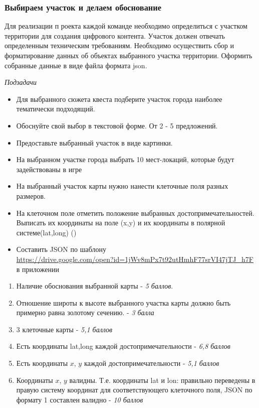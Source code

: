 
\subsubsection*{Выбираем участок и делаем обоснование}

Для реализации п
роекта каждой команде необходимо определиться с участком территории для создания цифрового контента. Участок должен отвечать определенным техническим требованиям. Необходимо осуществить сбор и форматирование данных об объектах выбранного участка территории. Оформить собранные данные в виде файла формата json.

\textit{Подзадачи}
\begin{itemize} 
    \item Для выбранного сюжета квеста подберите участок города наиболее тематически подходящий. 
    \item Обоснуйте свой выбор в текстовой форме. От 2 - 5 предложений.
    \item Предоставьте выбранный участок в виде картинки.
    \item На выбранном участке города выбрать 10 мест-локаций, которые будут задействованы в игре
    \item На выбранный участок карты нужно нанести клеточные поля разных размеров.
    \item На клеточном поле отметить положение выбранных достопримечательностей. Выписать их координаты на поле (x,y) и их координаты в полярной системе(lat,long) ()
    \item Составить JSON по шаблону \\ \url{https://drive.google.com/open?id=1jWv8mPx7t92utHmhF77srVI47jTJ_h7F}  в приложении
\end{itemize}

\markSection

\begin{enumerate}
    \item Наличие обоснования выбранной карты - \textit{5 баллов}.
    \item Отношение широты к высоте выбранного участка карты должно быть примерно равна золотому сечению. - \textit{3 балла}
    \item 3 клеточные карты - \textit{5,1 баллов}
    \item Есть координаты lat,long каждой достопримечательности - \textit{6,8 баллов}
    \item Есть координаты $x$, $y$ каждой достопримечательности - \textit{5,1 баллов}
    \item Координаты $x$, $y$ валидны. Т.е. координаты lat и lon: правильно переведены в правую систему координат для соответствующего клеточного поля, JSON по формату 1 составлен валидно - \textit{10 баллов}
\end{enumerate}

